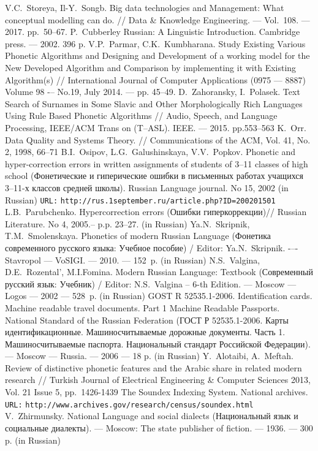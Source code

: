\documentclass[conference,a4paper]{IEEEtran}
\providecommand\url[1]{\texttt{#1}}
\begin{document}
\begin{thebibliography}{11}

 V.C.~Storeya, Il-Y.~Songb. Big data technologies and Management: What conceptual modelling can do. // Data \& Knowledge Engineering. --- Vol.~108. --- 2017. pp.~50--67.
 P.~Cubberley Russian: A Linguistic Introduction. Cambridge press. --– 2002. 396 p.
	V.P.~Parmar, C.K.~Kumbharana. Study Existing Various Phonetic Algorithms and Designing and Development of a working model for the New Developed Algorithm and Comparison by implementing it with Existing Algorithm(s) // International Journal of Computer Applications (0975 –-- 8887) Volume 98 -– No.19, July 2014. --– pp. 45--49.
 D.~Zahoransky, I.~Polasek. Text Search of Surnames in Some Slavic and Other Morphologically Rich Languages Using Rule Based Phonetic Algorithms // Audio, Speech, and Language Processing, IEEE/ACM Trans on (T--ASL). IEEE. --– 2015. pp.553--563
 K.~Orr. Data Quality and Systems Theory. // Communications of the ACM, Vol. 41, No. 2, 1998, 66--71
	B.I.~Osipov, L.G.~Galushinskaya, V.V.~Popkov. Phonetic and hyper-correction errors in written assignments of students of 3--11 classes of high school (Фонетические и гиперические ошибки в письменных работах учащихся 3–11-х классов средней школы). Russian Language journal. No 15, 2002 (in Russian) \texttt{URL:} \url{http://rus.1september.ru/article.php?ID=200201501}
 L.B.~Parubchenko. Hypercorrection errors (Ошибки гиперкоррекции)// Russian Literature. No 4, 2005.-- p.p. 23--27. (in Russian)
 Ya.N.~Skripnik, T.M.~Smolenskaya. Phonetics of modern Russian Language (Фонетика современного русского языка: Учебное пособие) / Editor: Ya.N.~Skripnik. -–- Stavropol --- VoSIGI. --- 2010. --– 152~p. (in Russian)
 N.S.~Valgina, D.E.~Rozental', M.I.Fomina. Modern Russian Language: Textbook (Современный русский язык: Учебник) / Editor: N.S.~Valgina -- 6-th Edition. --- Moscow --- Logos --- 2002 --– 528~p. (in Russian)
 GOST R 52535.1-2006. Identification cards. Machine readable travel documents. Part 1 Machine Readable Passports. National Standard of the Russian Federation (ГОСТ Р 52535.1-2006. Карты идентификационные. Машиносчитываемые дорожные документы. Часть 1. Машиносчитываемые паспорта. Национальный стандарт Российской Федерации). --- Moscow --- Russia. --- 2006 --- 18 p. (in Russian)
 Y.~Alotaibi, A.~Meftah. Review of distinctive phonetic features and the Arabic share in related modern research // Turkish Journal of Electrical Engineering \& Computer Sciences 2013, Vol. 21 Issue 5, pp.~1426-1439
	The Soundex Indexing System. National archives. \texttt{URL:} \url{http://www.archives.gov/research/census/soundex.html}
 V.~Zhirmunsky. National Language and social dialects (Национальный язык и социальные диалекты). --- Moscow: The state publisher of fiction. --- 1936. --- 300 p. (in Russian)






\end{thebibliography}
\end{document}
